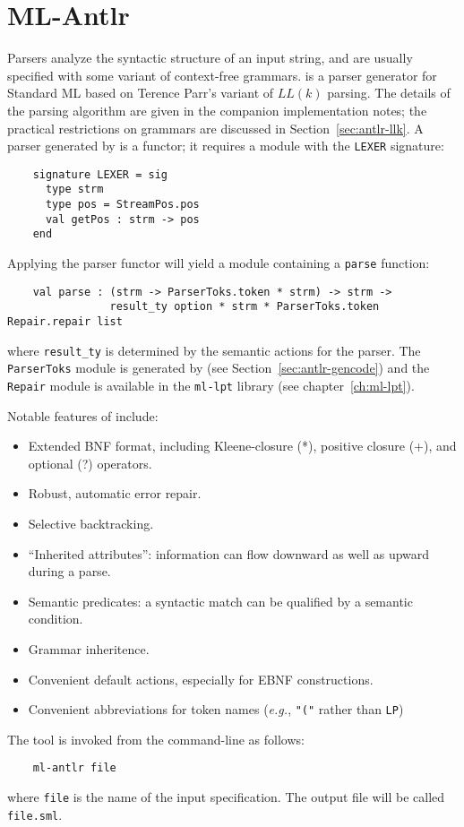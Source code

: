 \chapter{ML-Antlr}


Parsers analyze the syntactic structure of an input string, and are usually specified with some variant of context-free grammars.  \antlr{} is a parser generator for Standard ML based on Terence Parr's variant of $LL(k)$ parsing.  The details of the parsing algorithm are given in the companion implementation notes; the practical restrictions on grammars are discussed in Section~\ref{sec:antlr-llk}.  A parser generated by \antlr{} is a functor; it requires a module with the {\tt LEXER} signature:
\begin{verbatim}
    signature LEXER = sig
      type strm
      type pos = StreamPos.pos
      val getPos : strm -> pos
    end
\end{verbatim}
Applying the parser functor will yield a module containing a {\tt parse} function:
\begin{verbatim}
    val parse : (strm -> ParserToks.token * strm) -> strm -> 
                result_ty option * strm * ParserToks.token Repair.repair list
\end{verbatim}
where {\tt result\_ty} is determined by the semantic actions for the parser.  The {\tt ParserToks} module is generated by \antlr{} (see Section~\ref{sec:antlr-gencode}) and the {\tt Repair} module is available in the {\tt ml-lpt} library (see chapter~\ref{ch:ml-lpt}). 

Notable features of \antlr{} include:
\begin{itemize}
 \item Extended BNF format, including Kleene-closure (*), positive closure (+), and optional (?) operators.
 \item Robust, automatic error repair.
 \item Selective backtracking.
 \item ``Inherited attributes'': information can flow downward as well as upward during a parse.
 \item Semantic predicates: a syntactic match can be qualified by a semantic condition.
 \item Grammar inheritence.
 \item Convenient default actions, especially for EBNF constructions.
 \item Convenient abbreviations for token names (\emph{e{.}g{.}}, {\tt "("} rather than {\tt LP})
\end{itemize}
The tool is invoked from the command-line as follows:
\begin{verbatim}
    ml-antlr file
\end{verbatim}
where {\tt file} is the name of the input \ulex{} specification.
The output file will be called {\tt file.sml}.

